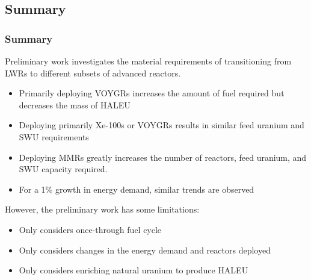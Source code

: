 \subsection{Summary}
\begin{frame}
\frametitle{Summary}
Preliminary work investigates the material requirements 
of transitioning from \glspl{LWR} to different 
subsets of advanced reactors.
\begin{itemize}
        \item Primarily deploying VOYGRs increases the amount of 
              fuel required but decreases the mass of \gls{HALEU}
        \item Deploying primarily Xe-100s or VOYGRs results in 
              similar feed uranium and \gls{SWU} requirements
        \item Deploying \glspl{MMR} greatly increases the number of 
              reactors, feed uranium, and \gls{SWU} capacity required.
        \item For a 1\% growth in energy demand, similar trends are 
              observed
\end{itemize}
However, the preliminary work has some limitations:
\begin{itemize}
        \item Only considers once-through fuel cycle
        \item Only considers changes in the energy demand and
              reactors deployed
        \item Only considers enriching natural uranium to produce 
              \gls{HALEU}
\end{itemize}
\end{frame}